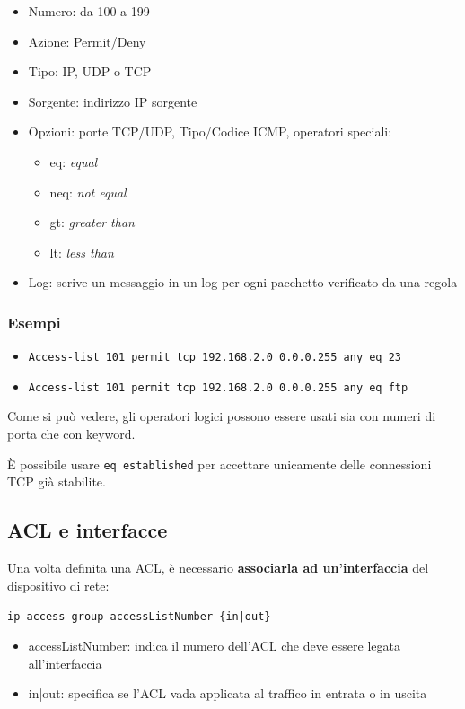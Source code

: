 \begin{itemize}
    \item Numero: da 100 a 199 
    \item Azione: Permit/Deny
    \item Tipo: IP, UDP o TCP 
    \item Sorgente: indirizzo IP sorgente 
    \item Opzioni: porte TCP/UDP, Tipo/Codice ICMP, operatori speciali:
    \begin{itemize}
        \item eq: \textit{equal} 
        \item neq: \textit{not equal}
        \item gt: \textit{greater than} 
        \item lt: \textit{less than}
    \end{itemize}
    \item Log: scrive un messaggio in un log per ogni pacchetto verificato da una regola
\end{itemize}

\subsubsection{Esempi}
\begin{itemize}
    \item \texttt{Access-list 101 permit tcp 192.168.2.0 0.0.0.255 any eq 23}
    \item \texttt{Access-list 101 permit tcp 192.168.2.0 0.0.0.255 any eq ftp}
\end{itemize}

\noindent Come si può vedere, gli operatori logici possono essere usati sia con numeri di 
porta che con keyword. 

\noindent È possibile usare \texttt{eq established} per accettare unicamente delle 
connessioni TCP già stabilite.

\subsection{ACL e interfacce}
Una volta definita una ACL, è necessario \textbf{associarla ad un'interfaccia}
del dispositivo di rete:

\begin{center}
    \texttt{ip access-group accessListNumber \{in|out\}}
\end{center}

\begin{itemize}
    \item accessListNumber: indica il numero dell'ACL che deve essere legata all'interfaccia 
    \item in|out: specifica se l'ACL vada applicata al traffico in entrata o in uscita
\end{itemize}

